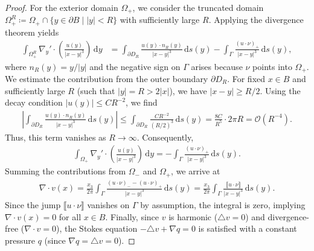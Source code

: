\documentclass{article}
\theoremstyle{remark}
\theoremstyle{definition}
\numberwithin{equation}{section}
\begin{document}
\begin{proof}
    For the exterior domain $\Omega_+$, we consider the truncated domain $\Omega_+^R \coloneqq \Omega_+\cap \{y \in \partial B \mid |y|<R\}$ with sufficiently large $R$.
    Applying the divergence theorem yields
    \begin{align*}
        \int_{\Omega_+^R}\nabla_y'\cdot\left(\frac{u(y)}{|x-y|^3}\right)\,\mathrm{d}y &= \int_{\partial D_R}\frac{u(y)\cdot n_R(y)}{|x-y|^3}\,\mathrm{d}s(y) - \int_\Gamma\frac{(u\cdot\nu)_+}{|x-y|^3}\,\mathrm{d}s(y),
    \end{align*}
    where $n_R(y) = y/|y|$ and the negative sign on $\Gamma$ arises because $\nu$ points into $\Omega_+$.
    We estimate the contribution from the outer boundary $\partial D_R$. For fixed $x \in B$ and sufficiently large $R$ (such that $|y|=R > 2|x|$), we have $|x-y| \ge R/2$.
    Using the decay condition $|u(y)| \le C R^{-2}$, we find
    \begin{align*}
        \left|\int_{\partial D_R}\frac{u(y)\cdot n_R(y)}{|x-y|^3}\,\mathrm{d}s(y)\right|
        \le \int_{\partial D_R} \frac{C R^{-2}}{(R/2)^3} \,\mathrm{d}s(y)
        = \frac{8C}{R^5} \cdot 2\pi R = \mathcal{O}(R^{-4}).
    \end{align*}
    Thus, this term vanishes as $R\to\infty$. Consequently,
    \begin{align*}
        \int_{\Omega_+}\nabla_y'\cdot\left(\frac{u(y)}{|x-y|^3}\right)\,\mathrm{d}y = -\int_\Gamma\frac{(u\cdot\nu)_+}{|x-y|^3}\,\mathrm{d}s(y).
    \end{align*}
    Summing the contributions from $\Omega_-$ and $\Omega_+$, we arrive at
    \begin{align*}
        \nabla\cdot v(x) 
        = \frac{x_3}{2\pi}\int_\Gamma \frac{(u\cdot\nu)_- - (u\cdot\nu)_+}{|x-y|^3}\,\mathrm{d}s(y)
        = \frac{x_3}{2\pi}\int_\Gamma \frac{\llbracket u\cdot\nu \rrbracket}{|x-y|^3}\,\mathrm{d}s(y).
    \end{align*}
    Since the jump $\llbracket u\cdot\nu \rrbracket$ vanishes on $\Gamma$ by assumption, the integral is zero, implying $\nabla\cdot v(x) = 0$ for all $x \in B$.
    Finally, since $v$ is harmonic ($\triangle v = 0$) and divergence-free ($\nabla \cdot v = 0$), the Stokes equation $-\triangle v + \nabla q = 0$ is satisfied with a constant pressure $q$ (since $\nabla q = \triangle v = 0$).
\end{proof}
\end{document}
